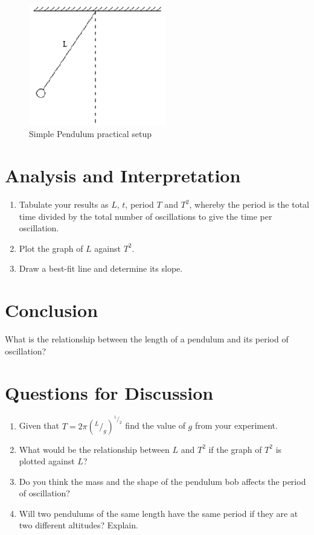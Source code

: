 \begin{figure}[h!]
\centering
\includegraphics[width=6cm]{./img/pendulum-1.png}
\caption{Simple Pendulum practical setup}
\label{fig:pendulum-1}
\end{figure}

\section{Analysis and Interpretation}
\begin{enumerate}
\item Tabulate your results as $L$, $t$, period $T$ and $T^2$, whereby the period is the total time divided by the total number of oscillations to give the time per oscillation.
\item Plot the graph of $L$ against $T^2$. 
\item Draw a best-fit line and determine its slope.
\end{enumerate}

\section{Conclusion}
What is the relationship between the length of a pendulum and its period of oscillation?

\section{Questions for Discussion}
\begin{enumerate}
\item Given that $T=2\pi(^L/_g)^{^1/_2}$  find the value of $g$ from your experiment.
\item What would be the relationship between $L$ and $T^2$ if the graph of $T^2$ is plotted against $L$?
\item Do you think the mass and the shape of the pendulum bob affects the period of oscillation? 
\item Will two pendulums of the same length have the same period if they are at two different altitudes? Explain.
\end{enumerate}

